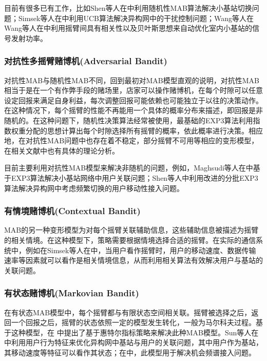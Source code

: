﻿\documentclass[11pt,draftclsnofoot,onecolumn,journal,letterpaper]{IEEEtran}
\begin{document}
目前有很多已有工作，比如Shen等人在\cite{Shen2017}中利用随机性MAB算法解决小基站切换问题；Simsek等人在\cite{Simsek2015a}中利用UCB算法解决异构网中的干扰控制问题；Wang等人在Wang等人在\cite{Wang2017}中利用摇臂间具有相关性以及贝叶斯思想来自动优化室内小基站的信号发射功率。

\subsubsection{对抗性多摇臂赌博机(Adversarial Bandit)}
对抗性MAB与随机性MAB不同，回到最初对MAB模型直观的说明，对抗性MAB相当于是在一个有作弊手段的赌场里，店家可以操作赌博机，在每个时隙可以任意设定回报来满足自身利益，每次调整回报可能依赖也可能独立于以往的决策动作。在这种情况下，每个摇臂的性能不再能用一个具体的概率分布来描述，即回报是非随机的。在这种问题下，随机性决策算法经常被使用，最基础的EXP3算法\cite{Auer2002}利用指数权重分配的思想计算出每个时隙选择所有摇臂的概率，依此概率进行决策。相应地，在对抗性MAB问题中也存在着不稳定，部分摇臂不可用等相应的变形模型，在相关文献中也有具体的理论分析。

目前主要利用对抗性MAB模型来解决非随机的问题，例如，Maghsudi等人在\cite{Maghsudi2017}中基于EXP3算法解决小基站网络中用户关联问题；Shen等人\cite{Shen2016}中利用改进的分批EXP3算法解决异构网中考虑频繁切换的用户移动性接入问题。

\subsubsection{有情境赌博机(Contextual Bandit)}
MAB的另一种变形模型为对每个摇臂关联辅助信息，这些辅助信息被描述为摇臂的相关情境。在这种模型下，策略需要根据情境选择合适的摇臂。在实际的通信系统中，例如在Simsek等人在\cite{Simsek2015a}中，当用户看作摇臂时，用户的移动速度、数据传输速率等因素就可以看作是相关情境信息，从而利用相关算法有效解决用户与基站的关联问题。



\subsubsection{有状态赌博机(Markovian Bandit)}
在有状态MAB模型中，每个摇臂都与有限状态空间相关联。摇臂被选择之后，返回一个回报之后，摇臂的状态依照一定的模型发生转化，一般为马尔科夫过程。基于这种模型，在 中提出了基于惠特尔指标策略来解决此种MAB模型。Sun等人在\cite{Sun2017}中利用用户行为特征来优化异构网中基站与用户的关联问题，其中用户作为基站，其移动速度等特征可以看作其状态；在\cite{Tekin2011}中，此模型用于解决机会频谱接入问题。
\end{document}
